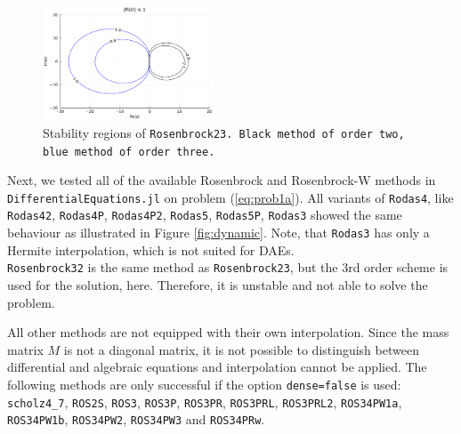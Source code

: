 \documentclass{juliacon}
\begin{document}
\begin{figure}[t]
 \centering
 \includegraphics[width=0.45\textwidth]{stability_rosenbrock23.pdf}
 \caption{Stability regions of \tt Rosenbrock23\rm. Black method of order two, blue method of order three.}\label{fig:stability}
\end{figure}

Next, we tested all of the available Rosenbrock and Rosenbrock-W methods in \verb|DifferentialEquations.jl| on problem (\ref{eq:prob1a}).
All variants of \verb|Rodas4|, like \verb|Rodas42|, \verb|Rodas4P|, \verb|Rodas4P2|, \verb|Rodas5|, 
\verb|Rodas5P|, \verb|Rodas3| showed the same behaviour as illustrated in Figure \ref{fig:dynamic}.
Note, that \verb|Rodas3| has only a Hermite interpolation, which is not suited for DAEs.\\

\verb|Rosenbrock32| is the same method as \verb|Rosenbrock23|, but the 3rd order scheme is used for the solution, here. Therefore, it is 
unstable and not able to solve the problem.

All other methods are not equipped with their own interpolation. Since the mass matrix $M$ is not a diagonal matrix, 
it is not possible to distinguish between differential and algebraic equations and interpolation cannot be applied.
The following methods are only successful if the option \verb|dense=false| is used:
\verb|scholz4_7|, \verb|ROS2S|, \verb|ROS3|, \verb|ROS3P|,  \verb|ROS3PR|, \verb|ROS3PRL|, \verb|ROS3PRL2|, \verb|ROS34PW1a|, \verb|ROS34PW1b|, \verb|ROS34PW2|, 
\verb|ROS34PW3| and \verb|ROS34PRw|. 
\end{document}
